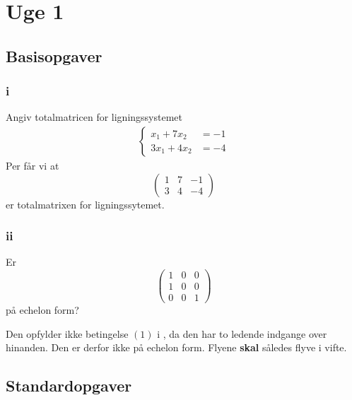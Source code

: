 
\chapter{Uge 1}

	\section{Basisopgaver}

		\subsection{i}

		Angiv totalmatricen for ligningssystemet
		\begin{align*}
			\left\{\begin{aligned} x_{1}+7 x_{2} &=-1 \\ 3 x_{1}+4 x_{2} &=-4 \end{aligned}\right.
		\end{align*} 
		Per \cite[Eksempel 1.1.2]{hesselholt2017} får vi at
			\begin{equation}
				\left(\begin{array}{rr|r} {1} & {7} & {-1} \\ {3} & {4} & {-4} \end{array}\right)
			\end{equation}
		er totalmatrixen for ligningssytemet.

		\subsection{ii}

		Er
			\begin{equation}
				\left(\begin{array}{lll}{1} & {0} & {0} \\ {1} & {0} & {0} \\ {0} & {0} & {1}\end{array}\right)
			\end{equation}
		på echelon form?

		Den opfylder ikke betingelse $(1)$ i \cite[Def. 1.2.7]{hesselholt2017}, da den har to ledende indgange over hinanden. Den er derfor ikke på echelon form. Flyene \textbf{skal} således flyve i vifte.

	\section{Standardopgaver}

